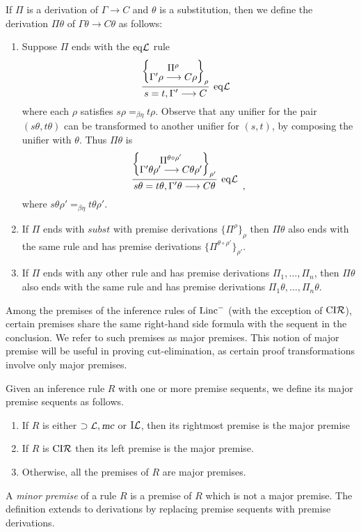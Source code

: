 \documentclass[preprint]{elsarticle}
\newcommand{\Linc}{{\rm Linc}^-}
\newcommand{\Seq}[2]{#1\longrightarrow #2}
\newcommand{\eqL}{{\rm eq}{\cal L}}
\newcommand{\indL}{{\rm I}{\cal L}}
\newcommand{\coindR}{{\rm CI}{\cal R}}
\newcommand{\mc}{\hbox{\sl mc}}
\newcommand{\oimpL}{\oimp{\cal L}}
\newcommand{\oimp}{\supset}
\begin{document}
\begin{definition}
  \label{def:subst}
  If $\Pi$ is a derivation of $\Seq{\Gamma}{C}$ and $\theta$ is a
  substitution, then we define the derivation $\Pi\theta$ of
  $\Seq{\Gamma\theta}{C\theta}$ as follows:
  \begin{enumerate}
  \item Suppose $\Pi$ ends with the $\eqL$ rule
    \begin{displaymath}
      \infer[\eqL]{\Seq {s = t,\Gamma'}{C} }
      {\left\{\raisebox{-1.5ex}
          {\deduce{\Seq{\Gamma'\rho}{C\rho}}
            {\Pi^{\rho}}}
        \right\}_{\rho}}
      \enspace 
    \end{displaymath}
    where each $\rho$ satisfies $s\rho =_{\beta\eta} t\rho$. Observe
    that any unifier for the pair $(s\theta, t\theta)$ can be
    transformed to another unifier for $(s, t)$, by composing the
    unifier with $\theta$.  Thus $\Pi\theta$ is
    \begin{displaymath}
      \infer[\eqL]{\Seq{s\theta = t\theta,\Gamma'\theta}{C\theta}}
      {\left\{\raisebox{-1.5ex}
          {\deduce{\Seq{\Gamma'\theta\rho'}{C\theta\rho'}}
            {\Pi^{\theta\circ\rho'}}}
	\right\}_{\rho'}}
      \enspace ,
    \end{displaymath}
    where $s\theta\rho' =_{\beta\eta} t\theta\rho'$.

  \item If $\Pi$ ends with $subst$ with premise derivations
    $\{\Pi^\rho\}_\rho$ then $\Pi\theta$ also ends with the same rule
    and has premise derivations $\{\Pi^{\theta \circ \rho'}
    \}_{\rho'}$.
  \item If $\Pi$ ends with any other rule and has premise derivations
    $\Pi_1, \ldots, \Pi_n$, then $\Pi\theta$ also ends with the same
    rule and has premise derivations $\Pi_1\theta, \ldots,
    \Pi_n\theta$.
  \end{enumerate}
\end{definition}


Among the premises of the inference rules of $\Linc$ (with the exception
of $\coindR$), certain premises share the same right-hand side formula 
with the sequent in the conclusion.  We refer to such
premises as major premises. This notion of major premise will be
useful in proving cut-elimination, as certain proof transformations
involve only major premises.
\begin{definition}
  \label{def:major-premise}
  Given an inference rule $R$ with one or more premise sequents, we
  define its major premise sequents as follows.
  \begin{enumerate}
  \item If $R$ is either $\oimpL, \mc$ or $\indL$, then its rightmost
    premise is the major premise
  \item If $R$ is $\coindR$ then its left premise is the major
    premise.
  \item Otherwise, all the premises of $R$ are major premises.
  \end{enumerate}
  A \emph{minor premise} of a rule $R$ is a premise of $R$ which is
  not a major premise.  The definition extends to derivations by
  replacing premise sequents with premise derivations.
\end{definition}
\end{document}
